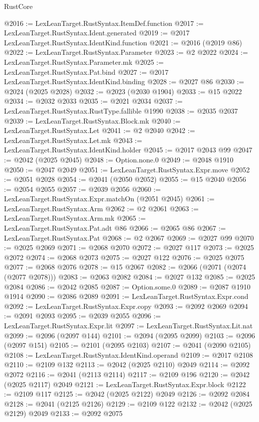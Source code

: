 \begin{lexlean}{RustCore}
\begin{coremodule}
@2016 := LexLeanTarget.RustSyntax.ItemDef.function
@2017 := LexLeanTarget.RustSyntax.Ident.generated
@2019 := @2017 LexLeanTarget.RustSyntax.IdentKind.function
@2021 := @2016 (@2019 @86)
@2022 := LexLeanTarget.RustSyntax.Parameter
@2023 := @2 @2022
@2024 := LexLeanTarget.RustSyntax.Parameter.mk
@2025 := LexLeanTarget.RustSyntax.Pat.bind
@2027 := @2017 LexLeanTarget.RustSyntax.IdentKind.binding
@2028 := @2027 @86
@2030 := @2024 (@2025 @2028)
@2032 := @2023 (@2030 @1904)
@2033 := @15 @2022
@2034 := @2032 @2033
@2035 := @2021 @2034
@2037 := LexLeanTarget.RustSyntax.RustType.fallible @1990
@2038 := @2035 @2037
@2039 := LexLeanTarget.RustSyntax.Block.mk
@2040 := LexLeanTarget.RustSyntax.Let
@2041 := @2 @2040
@2042 := LexLeanTarget.RustSyntax.Let.mk
@2043 := LexLeanTarget.RustSyntax.IdentKind.holder
@2045 := @2017 @2043 @99
@2047 := @2042 (@2025 @2045)
@2048 := Option.none.{0}
@2049 := @2048 @1910
@2050 := @2047 @2049
@2051 := LexLeanTarget.RustSyntax.Expr.move
@2052 := @2051 @2028
@2054 := @2041 (@2050 @2052)
@2055 := @15 @2040
@2056 := @2054 @2055
@2057 := @2039 @2056
@2060 := LexLeanTarget.RustSyntax.Expr.matchOn (@2051 @2045)
@2061 := LexLeanTarget.RustSyntax.Arm
@2062 := @2 @2061
@2063 := LexLeanTarget.RustSyntax.Arm.mk
@2065 := LexLeanTarget.RustSyntax.Pat.adt @86
@2066 := @2065 @86
@2067 := LexLeanTarget.RustSyntax.Pat
@2068 := @2 @2067
@2069 := @2027 @99
@2070 := @2025 @2069
@2071 := @2068 @2070
@2072 := @2027 @117
@2073 := @2025 @2072
@2074 := @2068 @2073
@2075 := @2027 @122
@2076 := @2025 @2075
@2077 := @2068 @2076
@2078 := @15 @2067
@2082 := @2066 (@2071 (@2074 (@2077 @2078)))
@2083 := @2063 @2082
@2084 := @2027 @132
@2085 := @2025 @2084
@2086 := @2042 @2085
@2087 := Option.some.{0}
@2089 := @2087 @1910 @1914
@2090 := @2086 @2089
@2091 := LexLeanTarget.RustSyntax.Expr.cond
@2092 := LexLeanTarget.RustSyntax.Expr.copy
@2093 := @2092 @2069
@2094 := @2091 @2093
@2095 := @2039 @2055
@2096 := LexLeanTarget.RustSyntax.Expr.lit
@2097 := LexLeanTarget.RustSyntax.Lit.nat
@2099 := @2096 (@2097 @144)
@2101 := @2094 (@2095 @2099)
@2103 := @2096 (@2097 @151)
@2105 := @2101 (@2095 @2103)
@2107 := @2041 (@2090 @2105)
@2108 := LexLeanTarget.RustSyntax.IdentKind.operand
@2109 := @2017 @2108
@2110 := @2109 @132
@2113 := @2042 (@2025 @2110) @2049
@2114 := @2092 @2072
@2116 := @2041 (@2113 @2114)
@2117 := @2109 @196
@2120 := @2042 (@2025 @2117) @2049
@2121 := LexLeanTarget.RustSyntax.Expr.block
@2122 := @2109 @117
@2125 := @2042 (@2025 @2122) @2049
@2126 := @2092 @2084
@2128 := @2041 (@2125 @2126)
@2129 := @2109 @122
@2132 := @2042 (@2025 @2129) @2049
@2133 := @2092 @2075

\end{coremodule}
\end{lexlean}
